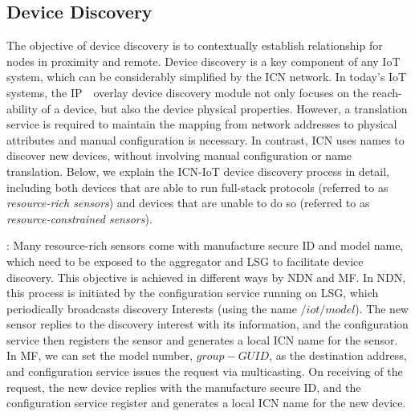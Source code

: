 \subsection{Device Discovery}
The objective of device discovery is to contextually establish relationship for nodes in proximity and remote. Device discovery is a key component of any IoT system, which can be considerably simplified by the ICN network. In today's IoT systems, the IP　overlay device discovery module not only focuses on the reach-ability of a device, but also the device physical properties\cite{iotivity,alljoyn}. However, a translation service is required to maintain the mapping from network addresses to physical attributes and manual configuration is necessary. In contrast, ICN uses names to discover new devices, without involving manual configuration or name translation. Below, we explain the ICN-IoT device discovery process in detail, including both devices that are able to run  full-stack protocols (referred to as \emph{resource-rich sensors}) and devices that are unable to do so (referred to as \emph{resource-constrained sensors}).

\vspace{1mm}: Many resource-rich sensors come with manufacture secure ID and model name, which need to be exposed to the aggregator and LSG to facilitate device discovery. This objective is achieved in different ways by NDN and MF.  In NDN, this process is initiated by the configuration service running on LSG, which periodically broadcasts discovery Interests (using the name $/iot/model$). The new sensor replies to the discovery interest with its information, and the configuration service then registers the sensor and generates a local ICN name for the sensor. In MF, we can set the model number, $group-GUID$, as the destination address, and configuration service issues the request via multicasting. On receiving of the request, the new device replies with the manufacture secure ID, and the configuration service register and generates a local ICN name for the new device.


